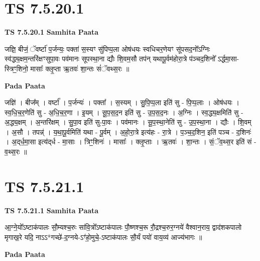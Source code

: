 \documentclass[17pt]{extarticle}
\begin{document}

\section{ TS 7.5.20.1 }

\textbf{TS 7.5.20.1 } \newline
\textbf{Samhita Paata} \newline

जज्ञि॒ बीजं॒ ॅवर्ष्टा॑ प॒र्जन्यः॒ पक्ता॑ स॒स्यꣳ सु॑पिप्प॒ला ओष॑धयः स्वधिचर॒णेयꣳ सू॑पसद॒नो᳚ऽग्निः स्व॑द्ध्य॒क्षम॒न्तरि॑क्षꣳसुपा॒वः पव॑मानः सूपस्था॒ना द्यौः शि॒वम॒सौ तप॑न् यथापू॒र्वम॑होरा॒त्रे प॑ञ्चद॒शिनो᳚ ऽर्द्धमा॒सा-स्त्रिꣳ॒॒शिनो॒ मासाः᳚ क्लृ॒प्ता ऋ॒तवः॑ शा॒न्तः सं॑ॅवथ्स॒रः ॥ \newline

\textbf{Pada Paata} \newline

जज्ञि॑ । बीज᳚म् । वर्ष्टा᳚ । प॒र्जन्यः॑ । पक्ता᳚ । स॒स्यम् । सु॒पि॒प्प॒ला इति॑ सु - पि॒प्प॒लाः । ओष॑धयः । स्व॒धि॒च॒र॒णेति॑ सु - अ॒धि॒च॒र॒णा । इ॒यम् । सू॒प॒स॒द॒न इति॑ सु - उ॒प॒स॒द॒नः । अ॒ग्निः । स्व॒द्ध्य॒क्षमिति॑ सु - अ॒द्ध्य॒क्षम् । अ॒न्तरि॑क्षम् । सु॒पा॒व इति॑ सु-पा॒वः । पव॑मानः । सू॒प॒स्था॒नेति॑ सु - उ॒प॒स्था॒ना । द्यौः । शि॒वम् । अ॒सौ । तपन्न्॑ । य॒था॒पू॒र्वमिति॑ यथा - पू॒र्वम् । अ॒हो॒रा॒त्रे इत्य॑हः - रा॒त्रे । प॒ञ्च॒द॒शिन॒ इति॑ पञ्च - द॒शिनः॑ । अ॒द्‌र्ध॒मा॒सा इत्य॑द्‌र्ध - मा॒साः । त्रिꣳ॒॒शिनः॑ । मासाः᳚ । क्लृ॒प्ताः । ऋ॒तवः॑ । शा॒न्तः । सं॒ॅव॒थ्स॒र इति॑ सं - व॒थ्स॒रः ॥  \newline





\section{ TS 7.5.21.1 }

\textbf{TS 7.5.21.1 } \newline
\textbf{Samhita Paata} \newline

आ॒ग्ने॒यो᳚ऽष्टाक॑पालः सौ॒म्यश्च॒रुः सा॑वि॒त्रो᳚ऽष्टाक॑पालः पौ॒ष्णश्च॒रू रौ॒द्रश्च॒रुर॒ग्नये॑ वैश्वान॒राय॒ द्वाद॑शकपालो मृगाख॒रे यदि॒ नाऽऽ*गच्छे॑-द॒ग्नये-ऽꣳ॑हो॒मुचे॒-ऽष्टाक॑पालः सौ॒र्यं पयो॑ वाय॒व्य॑ आज्य॑भागः ॥ \newline

\textbf{Pada Paata} \newline
\end{document}
